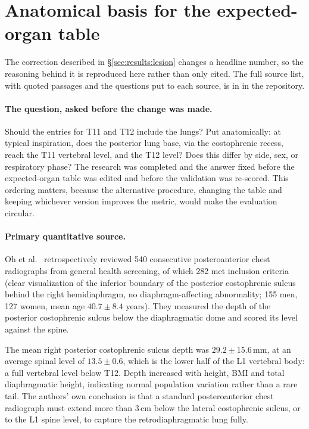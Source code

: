 \section{Anatomical basis for the expected-organ table}
\label{app:anatomy}

The correction described in \S\ref{sec:results:lesion} changes a headline
number, so the reasoning behind it is reproduced here rather than only cited. The
full source list, with quoted passages and the questions put to each source, is
in  in the repository.

\paragraph{The question, asked before the change was made.}
Should the  entries for T11 and T12 include the lungs? Put
anatomically: at typical inspiration, does the posterior lung base, via the
costophrenic recess, reach the T11 vertebral level, and the T12 level? Does this
differ by side, sex, or respiratory phase? The research was completed and the
answer fixed before the expected-organ table was edited and before the
validation was re-scored. This ordering matters, because the alternative
procedure, changing the table and keeping whichever version improves the metric,
would make the evaluation circular.

\paragraph{Primary quantitative source.}
Oh et al.\ \cite{oh2009retrodiaphragmatic} retrospectively reviewed 540
consecutive posteroanterior chest radiographs from general health screening, of
which 282 met inclusion criteria (clear visualization of the inferior boundary
of the posterior costophrenic sulcus behind the right hemidiaphragm, no
diaphragm-affecting abnormality; 155 men, 127 women, mean age
$40.7 \pm 8.4$ years). They measured the depth of the posterior costophrenic
sulcus below the diaphragmatic dome and scored its level against the spine.

The mean right posterior costophrenic sulcus depth was $29.2 \pm 15.6$\,mm, at
an average spinal level of $13.5 \pm 0.6$, which is the lower half of the L1
vertebral body: a full vertebral level below T12. Depth increased with height,
BMI and total diaphragmatic height, indicating normal population variation
rather than a rare tail. The authors' own conclusion is that a standard
posteroanterior chest radiograph must extend more than 3\,cm below the lateral
costophrenic sulcus, or to the L1 spine level, to capture the retrodiaphragmatic
lung fully.

